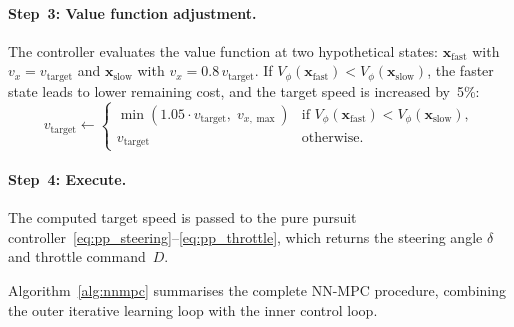 \paragraph{Step~3: Value function adjustment.} The controller evaluates the value function at two hypothetical states: $\mathbf{x}_{\mathrm{fast}}$ with $v_x = v_{\mathrm{target}}$ and $\mathbf{x}_{\mathrm{slow}}$ with $v_x = 0.8\,v_{\mathrm{target}}$. If $V_\phi(\mathbf{x}_{\mathrm{fast}}) < V_\phi(\mathbf{x}_{\mathrm{slow}})$, the faster state leads to lower remaining cost, and the target speed is increased by~5\%:
\begin{equation*}
	v_{\mathrm{target}} \leftarrow
	\begin{cases}
		\min(1.05 \cdot v_{\mathrm{target}},\; v_{x,\max}) & \text{if } V_\phi(\mathbf{x}_{\mathrm{fast}}) < V_\phi(\mathbf{x}_{\mathrm{slow}}), \\
		v_{\mathrm{target}} & \text{otherwise.}
	\end{cases}
\end{equation*}

\paragraph{Step~4: Execute.} The computed target speed is passed to the pure pursuit controller~\eqref{eq:pp_steering}--\eqref{eq:pp_throttle}, which returns the steering angle $\delta$ and throttle command~$D$.

Algorithm~\ref{alg:nnmpc} summarises the complete NN-MPC procedure, combining the outer iterative learning loop with the inner control loop.


